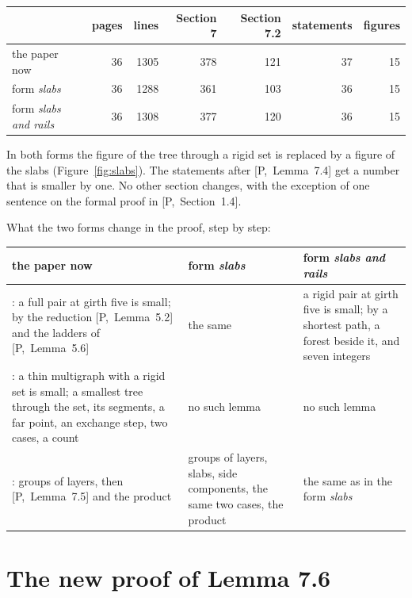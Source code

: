 \documentclass[11pt]{article}
\newcommand{\inP}[1]{[P,~#1]}
\begin{document}
\begin{center}\small
\begin{tabular}{lrrrrrr}
\toprule
 & pages & lines & Section 7 & Section 7.2 & statements & figures\\
\midrule
the paper now & 36 & 1305 & 378 & 121 & 37 & 15\\
form \emph{slabs} & 36 & 1288 & 361 & 103 & 36 & 15\\
form \emph{slabs and rails} & 36 & 1308 & 377 & 120 & 36 & 15\\
\bottomrule
\end{tabular}
\end{center}

In both forms the figure of the tree through a rigid set is replaced by a figure of the slabs
(Figure~\ref{fig:slabs}). The statements after \inP{Lemma~7.4} get a number that is smaller by
one. No other section changes, with the exception of one sentence on the formal proof in
\inP{Section~1.4}.

What the two forms change in the proof, step by step:

\begin{center}\small
\begin{tabular}{p{}p{}p{}}
\toprule
the paper now & form \emph{slabs} & form \emph{slabs and rails}\\
\midrule
\inP{Lemma~7.4}: a full pair at girth five is small; by the reduction \inP{Lemma~5.2} and the
ladders of \inP{Lemma~5.6} & the same & a rigid pair at girth five is small; by a shortest
path, a forest beside it, and seven integers\\
\addlinespace
\inP{Lemma~7.5}: a thin multigraph with a rigid set is small; a smallest tree through the set,
its segments, a far point, an exchange step, two cases, a count & no such lemma & no such
lemma\\
\addlinespace
\inP{Lemma~7.6}: groups of layers, then \inP{Lemma~7.5} and the product & groups of layers,
slabs, side components, the same two cases, the product & the same as in the form
\emph{slabs}\\
\bottomrule
\end{tabular}
\end{center}

\section{The new proof of Lemma 7.6}
\end{document}
